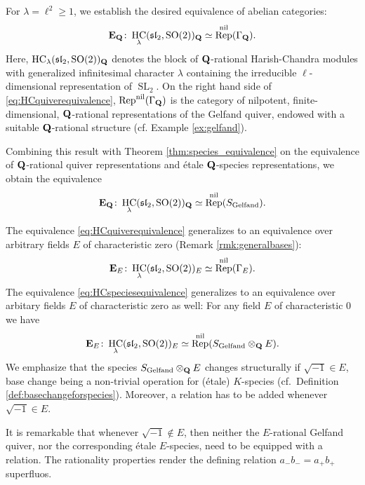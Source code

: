 \documentclass[a4paper,12pt,reqno]{amsart}
\newcommand{\QQ}{{\rm\bf Q}}
\newcommand{\EE}{{\rm\bf E}}
\DeclareMathOperator{\SL}{\mathrm{SL}}
\DeclareMathOperator{\SO}{\mathrm{SO}}
\DeclareMathOperator{\HC}{\mathrm{HC}}
\DeclareMathOperator{\Rep}{\mathrm{Rep}}
\newcommand{\liesl}{{\mathfrak {sl}}}
\theoremstyle{plain}
\theoremstyle{remark}
\begin{document}
    For $\lambda=\ell^2\geq 1$, we establish the desired equivalence of abelian categories:
    \begin{equation}
      \EE_\QQ\colon\HC_\lambda(\liesl_2,\SO(2))_\QQ \simeq \Rep^{\mathrm{nil}}(\Gamma_\QQ).
      \label{eq:HCquiverequivalence}
    \end{equation}
    Here, $\HC_\lambda(\liesl_2,\SO(2))_\QQ$ denotes the block of $\QQ$-rational Harish-Chandra modules with generalized infinitesimal character $\lambda$ containing the irreducible $\ell$-dimensional representation of $\SL_2$. On the right hand side of \eqref{eq:HCquiverequivalence}, $\Rep^{\mathrm{nil}}(\Gamma_\QQ)$ is the category of nilpotent, finite-dimensional, $\QQ$-rational representations of the Gelfand quiver, endowed with a suitable $\QQ$-rational structure (cf. Example \ref{ex:gelfand}).

    Combining this result with Theorem \ref{thm:species_equivalence} on the equivalence of $\QQ$-rational quiver representations and \'etale $\QQ$-species representations, we obtain the equivalence
    \begin{equation}
      \EE_\QQ\colon\HC_\lambda(\liesl_2,\SO(2))_\QQ \simeq \Rep^{\mathrm{nil}}(S_{\rm Gelfand}).
      \label{eq:HCspeciesequivalence}
    \end{equation}
    
    The equivalence \eqref{eq:HCquiverequivalence} generalizes to an equivalence over arbitrary fields $E$ of characteristic zero (Remark \ref{rmk:generalbases}):
    \[
    \EE_E\colon\HC_\lambda(\liesl_2,\SO(2))_E \simeq \Rep^{\mathrm{nil}}(\Gamma_E).
    \]
    The equivalence \eqref{eq:HCspeciesequivalence} generalizes to an equivalence over arbitary fields $E$ of characteristic zero as well: For any field $E$ of characteristic $0$ we have
    \[
      \EE_E\colon\HC_\lambda(\liesl_2,\SO(2))_E \simeq \Rep^{\mathrm{nil}}(S_{\rm Gelfand}\otimes_\QQ E).
    \]
    We emphasize that the species $S_{\rm Gelfand}\otimes_\QQ E$ changes structurally if $\sqrt{-1}\in E$, base change being a non-trivial operation for (\'etale) $K$-species (cf.\ Definition \ref{def:basechangeforspecies}). Moreover, a relation has to be added whenever $\sqrt{-1}\in E$.

    It is remarkable that whenever $\sqrt{-1}\not\in E$, then neither the $E$-rational Gelfand quiver, nor the corresponding \'etale $E$-species, need to be equipped with a relation. The rationality properties render the defining relation $a_{-} b_{-} = a_{+} b_{+}$ superfluos.
    
\end{document}
